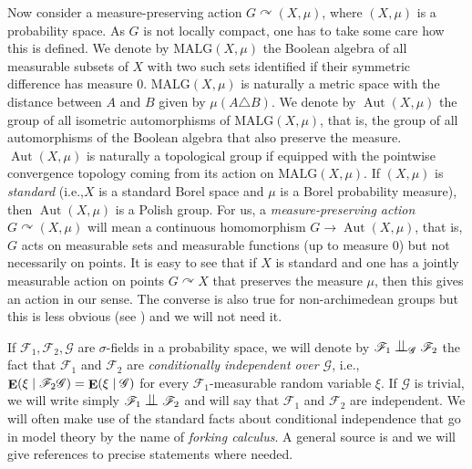 \documentclass[11pt]{article}
\newcommand{\ie}{i.e.,\xspace}
\let\mathcal\mathscr
\let\actson\curvearrowright
\let\sdiff\triangle
\theoremstyle{plain}
\theoremstyle{definition}
\newcommand{\cF}{\mathcal{F}}
\newcommand{\cG}{\mathcal{G}}
\DeclareMathOperator{\Aut}{Aut}
\DeclareMathOperator{\E}{\mathbf{E}}
\newcommand{\MALG}{\mathrm{MALG}}
\newcommand{\indep}[1][]{%
  \mathrel{
    \mathop{
      \scalebox{1}[1.3]{\text{$\perp\!\!\!\perp$}}
    }\displaylimits_{#1}
  }
}
\begin{document}
Now consider a measure-preserving action $G \actson (X, \mu)$, where $(X, \mu)$ is a probability space. As $G$ is not locally compact, one has to take some care how this is defined. We denote by $\MALG(X, \mu)$ the Boolean algebra of all measurable subsets of $X$ with two such sets identified if their symmetric difference has measure $0$. $\MALG(X, \mu)$ is naturally a metric space with the distance between $A$ and $B$ given by $\mu(A \sdiff B)$. We denote by $\Aut(X, \mu)$ the group of all isometric automorphisms of $\MALG(X, \mu)$, that is, the group of all automorphisms of the Boolean algebra that also preserve the measure. $\Aut(X, \mu)$ is naturally a topological group if equipped with the pointwise convergence topology coming from its action on $\MALG(X, \mu)$. If $(X, \mu)$ is \emph{standard} (\ie $X$ is a standard Borel space and $\mu$ is a Borel probability measure), then $\Aut(X, \mu)$ is a Polish group. For us, a \emph{measure-preserving action $G \actson (X, \mu)$} will mean a continuous homomorphism $G \to \Aut(X, \mu)$, that is, $G$ acts on measurable sets and measurable functions (up to measure $0$) but not necessarily on points. It is easy to see that if $X$ is standard and one has a jointly measurable action on points $G \actson X$ that preserves the measure $\mu$, then this gives an action in our sense. The converse is also true for non-archimedean groups but this is less obvious (see \cite[Th.\,2.3]{Glasner2005a}) and we will not need it.

If $\cF_1, \cF_2, \cG$ are $\sigma$-fields in a probability space, we will denote by $\cF_1 \indep[\cG] \cF_2$ the fact that $\cF_1$ and $\cF_2$ are \emph{conditionally independent over $\cG$}, \ie $\E(\xi \mid \cF_2\cG) = \E(\xi \mid\nobreak \cG)$ for every $\cF_1$-measurable random variable $\xi$. If $\cG$ is trivial, we will write simply $\cF_1 \indep \cF_2$ and will say that $\cF_1$ and $\cF_2$ are independent. We will often make use of the standard facts about conditional independence that go in model theory by the name of \emph{forking calculus}. A general source is \cite[Chap.\,5]{Kallenberg2002} and we will give references to precise statements where needed.
\end{document}
